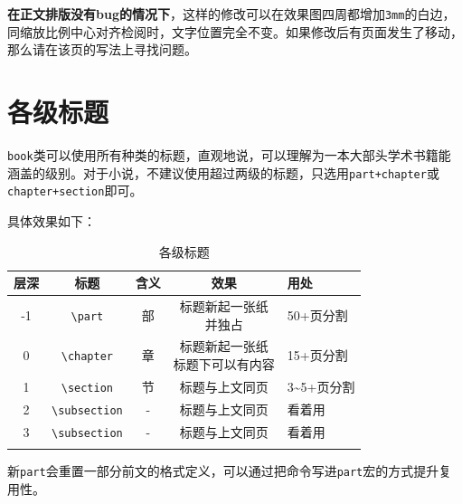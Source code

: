 \documentclass[10pt,openany]{book}
\begin{document}
\begin{sloppypar}
    \textbf{在正文排版没有bug的情况下}，这样的修改可以在效果图四周都增加\texttt{3mm}的白边，同缩放比例中心对齐检阅时，文字位置完全不变。如果修改后有页面发生了移动，那么请在该页的写法上寻找问题。

    \section{各级标题}
    \label{title}

    \texttt{book}类可以使用所有种类的标题，直观地说，可以理解为一本大部头学术书籍能涵盖的级别。对于小说，不建议使用超过两级的标题，只选用\texttt{part+chapter}或\texttt{chapter+section}即可。

    具体效果如下：

    \begin{center}
        \begin{longtable}{ccccl}
            \textbf{层深} & \textbf{标题}                        & \textbf{含义} & \textbf{效果}       & \textbf{用处}           \\
            \hline
            \endfirsthead
            -1          & \texttt{\textbackslash part}       & 部           & \makecell{标题新起一张纸                         \\并独占} & 50+页分割  \\
            \hline
            0           & \texttt{\textbackslash chapter}    & 章           & \makecell{标题新起一张纸                         \\标题下可以有内容} & 15+页分割\\
            \hline
            1           & \texttt{\textbackslash section}    & 节           & 标题与上文同页           & 3\textasciitilde5+页分割 \\
            \hline
            2           & \texttt{\textbackslash subsection} & -           & 标题与上文同页           & 看着用                   \\
            \hline
            3           & \texttt{\textbackslash subsection} & -           & 标题与上文同页           & 看着用                   \\
            \hline
            \caption{各级标题}
        \end{longtable}
    \end{center}

    新\texttt{part}会重置一部分前文的格式定义，可以通过把命令写进\texttt{part}宏的方式提升复用性。

    


\end{sloppypar}
\end{document}
